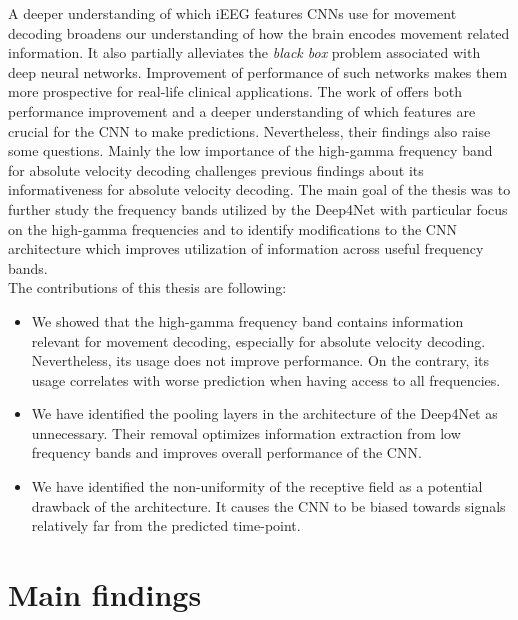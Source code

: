 


A deeper understanding of which iEEG features CNNs use for movement decoding broadens our understanding of how the brain encodes movement related information.
It also partially alleviates the \textit{black box} problem associated with deep neural networks.
Improvement of performance of such networks makes them more prospective for real-life clinical applications.
The work of \cite{Hammer-2021} offers both performance improvement and a deeper understanding of which features are crucial for the CNN to make predictions.
Nevertheless, their findings also raise some questions.
Mainly the low importance of the high-gamma frequency band for absolute velocity decoding challenges previous findings about its informativeness for absolute velocity decoding.
The main goal of the thesis was to further study the frequency bands utilized by the Deep4Net with particular focus on the high-gamma frequencies and to identify modifications to the CNN architecture which improves utilization of information across useful frequency bands. \\

The contributions of this thesis are following:
\begin{itemize}
    \item We showed that the high-gamma frequency band contains information relevant for movement decoding, especially for absolute velocity decoding. Nevertheless, its usage does not improve performance. On the contrary, its usage correlates with worse prediction when having access to all frequencies.
    \item We have identified the pooling layers in the architecture of the Deep4Net as unnecessary. Their removal optimizes information extraction from low frequency bands and improves overall performance of the CNN.
    \item We have identified the non-uniformity of the receptive field as a potential drawback of the architecture. It causes the CNN to be biased towards signals relatively far from the predicted time-point.
\end{itemize}


\section*{Main findings}

